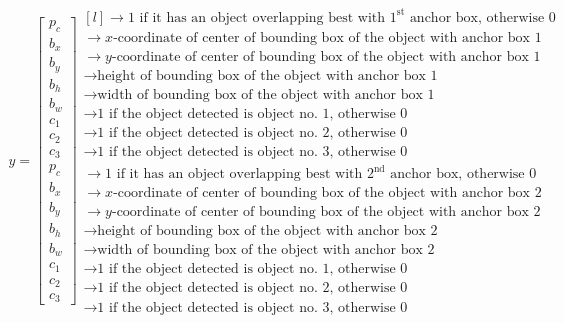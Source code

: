 \documentclass[a4paper, 12pt]{report}
\begin{document}
\begin{align*}
y=
\begin{bmatrix}
p_c\\b_x\\b_y\\b_h\\b_w\\c_1\\c_2\\c_3\\p_c\\b_x\\b_y\\b_h\\b_w\\c_1\\c_2\\c_3
\end{bmatrix}
\begin{matrix*}[l]
\rightarrow\text{1 if it has an object overlapping best with $1^{\text{st}}$ anchor box, otherwise 0}\\
\rightarrow\text{$x$-coordinate of center of bounding box of the object with anchor box 1}\\
\rightarrow\text{$y$-coordinate of center of bounding box of the object with anchor box 1}\\
\rightarrow\text{height of bounding box of the object with anchor box 1}\\
\rightarrow\text{width of bounding box of the object with anchor box 1}\\
\rightarrow\text{1 if the object detected is object no. 1, otherwise 0}\\
\rightarrow\text{1 if the object detected is object no. 2, otherwise 0}\\
\rightarrow\text{1 if the object detected is object no. 3, otherwise 0}\\
\rightarrow\text{1 if it has an object overlapping best with $2^{\text{nd}}$ anchor box, otherwise 0}\\
\rightarrow\text{$x$-coordinate of center of bounding box of the object with anchor box 2}\\
\rightarrow\text{$y$-coordinate of center of bounding box of the object with anchor box 2}\\
\rightarrow\text{height of bounding box of the object with anchor box 2}\\
\rightarrow\text{width of bounding box of the object with anchor box 2}\\
\rightarrow\text{1 if the object detected is object no. 1, otherwise 0}\\
\rightarrow\text{1 if the object detected is object no. 2, otherwise 0}\\
\rightarrow\text{1 if the object detected is object no. 3, otherwise 0}
\end{matrix*}
\end{align*}
\end{document}
